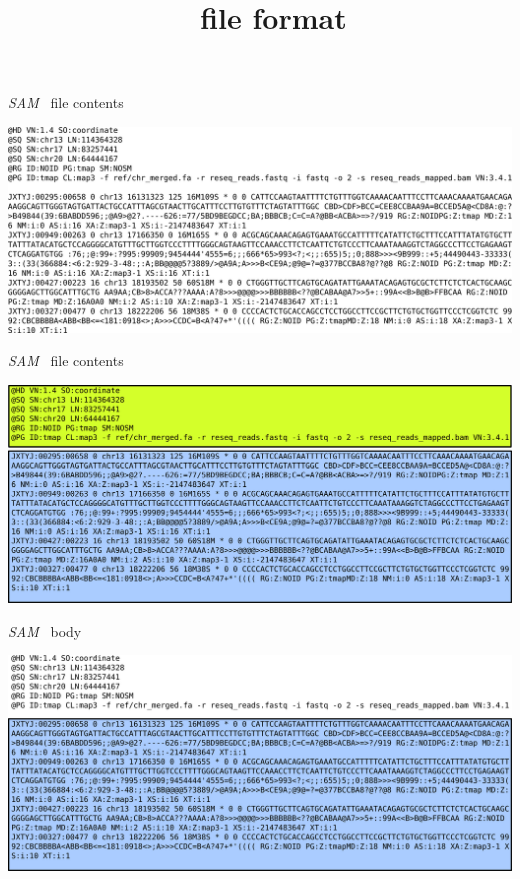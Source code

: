 \documentclass{beamer}
\title{\sam~ file format}
\date{}
\newcommand{\sam}{\textit{SAM}}
\begin{document}
\frame{\titlepage}

\begin{frame}{\sam~ file contents}
  \begin{center}
    \includegraphics[width=\linewidth, keepaspectratio]{pic/sam_full.png}
  \end{center}
\end{frame}

\begin{frame}{\sam~ file contents}
  \begin{center}
    \includegraphics[width=\linewidth, keepaspectratio]{pic/sam_full_hb.png}
  \end{center}
\end{frame}



\begin{frame}{\sam~ body}
  \begin{center}
    \includegraphics[width=\linewidth, keepaspectratio]{pic/sam_full_b.png}
  \end{center}
\end{frame}
\end{document}
